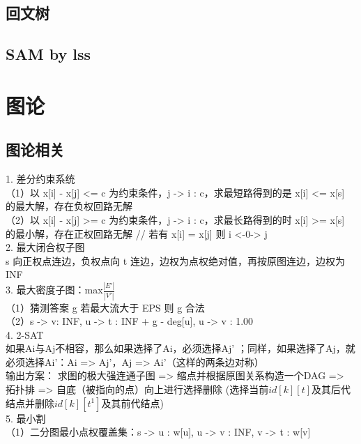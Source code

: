 \documentclass[landscape,a4paper]{article}
\begin{document}
\begin{spacing}{0.3}
\begin{multicols}{2}
		\subsection{回文树}
		
		\subsection{SAM by lss}
		
	\section{图论}
		\subsection{图论相关}
		
		1. 差分约束系统\\
  （1）以 x[i] - x[j] <= c 为约束条件，j -> i : c，求最短路得到的是 x[i] <= x[s] 的最大解，存在负权回路无解\\
  （2）以 x[i] - x[j] >= c 为约束条件，j -> i : c，求最长路得到的时 x[i] >= x[s] 的最小解，存在正权回路无解
  // 若有 x[i] = x[j] 则 i <-0-> j\\
2. 最大闭合权子图\\
  s 向正权点连边，负权点向 t 连边，边权为点权绝对值，再按原图连边，边权为INF\\
3. 最大密度子图：max{$\frac{|E'|}{|V'|}$}\\
  （1）猜测答案 g 若最大流大于 EPS 则 g 合法\\
  （2）s -> v: INF, u -> t : INF + g - deg[u], u -> v : 1.00\\
4. 2-SAT\\
  如果Ai与Aj不相容，那么如果选择了Ai，必须选择Aj' ；同样，如果选择了Aj，就必须选择Ai'：Ai => Aj'，Aj => Ai'（这样的两条边对称）\\
  输出方案：  求图的极大强连通子图 => 缩点并根据原图关系构造一个DAG => 拓扑排 => 自底（被指向的点）向上进行选择删除
(选择当前$id[k][t]$及其后代结点并删除$id[k][t^1]$及其前代结点)\\
5. 最小割\\

（1）二分图最小点权覆盖集：s -> u : w[u], u -> v : INF, v -> t : w[v]\\



\end{multicols}
\end{spacing}
\end{document}

